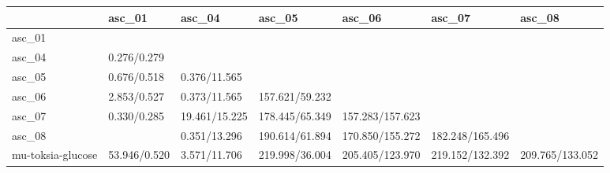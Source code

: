\begin{tabular}{lllllll}
\toprule
{} &        asc\_01 &         asc\_04 &          asc\_05 &           asc\_06 &           asc\_07 &           asc\_08 \\
\midrule
asc\_01            &               &                &                 &                  &                  &                  \\
asc\_04            &   0.276/0.279 &                &                 &                  &                  &                  \\
asc\_05            &   0.676/0.518 &   0.376/11.565 &                 &                  &                  &                  \\
asc\_06            &   2.853/0.527 &   0.373/11.565 &  157.621/59.232 &                  &                  &                  \\
asc\_07            &   0.330/0.285 &  19.461/15.225 &  178.445/65.349 &  157.283/157.623 &                  &                  \\
asc\_08            &               &   0.351/13.296 &  190.614/61.894 &  170.850/155.272 &  182.248/165.496 &                  \\
mu-toksia-glucose &  53.946/0.520 &   3.571/11.706 &  219.998/36.004 &  205.405/123.970 &  219.152/132.392 &  209.765/133.052 \\
\bottomrule
\end{tabular}
